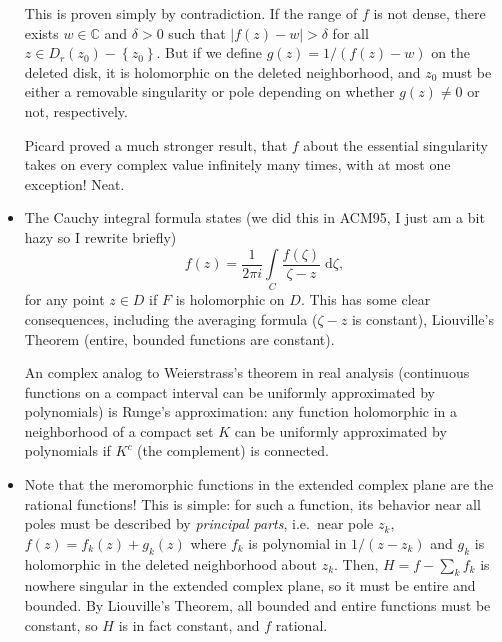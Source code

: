 \documentclass[11pt,
        usenames, %
        dvipsnames %
    ]{report}
\newcommand*{\abs}[1]{\left|#1\right|}
\newcommand*{\p}[1]{\left(#1\right)}
\newcommand*{\z}[1]{\left\{#1\right\}}
\begin{document}
\begin{itemize}
        This is proven simply by contradiction. If the range of $f$ is not
        dense, there exists $w \in \mathbb{C}$ and $\delta > 0$ such that
        $\abs{f(z) - w} > \delta$ for all $z \in D_r(z_0) - \z{z_0}$. But if we
        define $g(z) = 1 / \p{f(z) - w}$ on the deleted disk, it is holomorphic
        on the deleted neighborhood, and $z_0$ must be either a removable
        singularity or pole depending on whether $g(z) \neq 0$ or not,
        respectively.

        Picard proved a much stronger result, that $f$ about the essential
        singularity takes on every complex value infinitely many times, with at
        most one exception! Neat.

    \item The Cauchy integral formula states (we did this in ACM95, I just am a
        bit hazy so I rewrite briefly)
        \begin{equation}
            f(z) = \frac{1}{2\pi i}\int\limits_C \frac{f(\zeta)}{\zeta - z}
                \;\mathrm{d}\zeta,
        \end{equation}
        for any point $z \in D$ if $F$ is holomorphic on $D$. This has some
        clear consequences, including the averaging formula ($\zeta - z$ is
        constant), Liouville's Theorem (entire, bounded functions are constant).

        An complex analog to Weierstrass's theorem in real analysis (continuous
        functions on a compact interval can be uniformly approximated by
        polynomials) is Runge's approximation: any function holomorphic in a
        neighborhood of a compact set $K$ can be uniformly approximated by
        polynomials if $K^c$ (the complement) is connected.

    \item Note that the meromorphic functions in the extended complex plane are
        the rational functions! This is simple: for such a function, its
        behavior near all poles must be described by \emph{principal parts},
        i.e.\ near pole $z_k$, $f(z) = f_k(z) + g_k(z)$ where $f_k$ is
        polynomial in $1 / (z - z_k)$ and $g_k$ is holomorphic in the deleted
        neighborhood about $z_k$. Then, $H = f - \sum\limits_k f_k$ is nowhere
        singular in the extended complex plane, so it must be entire and
        bounded. By Liouville's Theorem, all bounded and entire functions must
        be constant, so $H$ is in fact constant, and $f$ rational.


\end{itemize}
\end{document}
